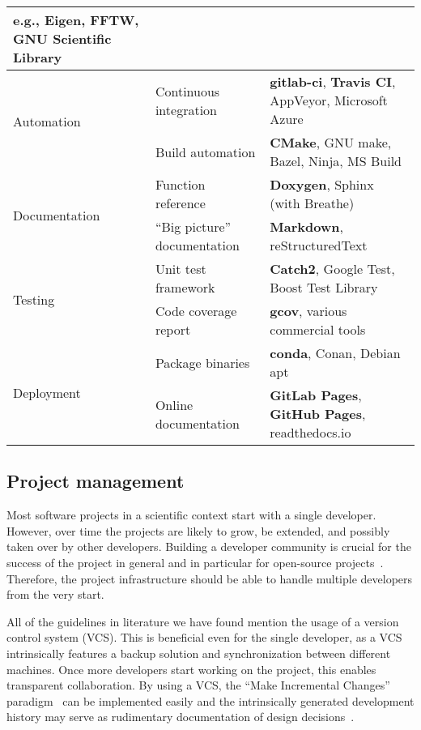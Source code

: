 \documentclass[@CLASSOPTIONS@]{tumarticle}
\begin{document}
\begin{table*}
\begin{tabular}{lll}
    e.g., Eigen, FFTW, GNU Scientific Library
    \\
    \hline
    \multirow{2}{*}{Automation}         & Continuous integration        &
    \textbf{gitlab-ci}, \textbf{Travis CI}, AppVeyor, Microsoft Azure
    \\
    \cline{2-3}
                                        & Build automation              &
    \textbf{CMake}, GNU make, Bazel, Ninja, MS Build
    \\
    \hline
    \multirow{2}{*}{Documentation}      & Function reference            &
    \textbf{Doxygen}, Sphinx (with Breathe)
    \\
    \cline{2-3}
                                        & ``Big picture'' documentation &
    \textbf{Markdown}, reStructuredText
    \\
    \hline
    \multirow{2}{*}{Testing}            & Unit test framework           &
    \textbf{Catch2}, Google Test, Boost Test Library
    \\
    \cline{2-3}
                                        & Code coverage report          &
    \textbf{gcov}, various commercial tools
    \\
    \hline
    \multirow{2}{*}{Deployment}         & Package binaries              &
    \textbf{conda}, Conan, Debian apt
    \\
    \cline{2-3}
                                        & Online documentation          &
    \textbf{GitLab Pages}, \textbf{GitHub Pages}, readthedocs.io
    \\
    \hline
  \end{tabular}
\end{table*}

\subsection{Project management}

Most software projects in a scientific context start with a single developer.
However, over time the projects are likely to grow, be extended, and possibly
taken over by other developers. Building a developer community is crucial for
the success of the project in general and in particular for open-source
projects~\cite{bangerth2013}. Therefore, the project infrastructure should be
able to handle multiple developers from the very start.

All of the guidelines in literature we have found mention the usage of a
version control system (VCS). This is beneficial even for the single
developer, as a VCS intrinsically features a backup solution and
synchronization between different machines. Once more developers start
working on the project, this enables transparent collaboration. By using a
VCS, the ``Make Incremental Changes'' paradigm~\cite{wilson2014, wilson2017}
can be implemented easily and the intrinsically generated development history
may serve as rudimentary documentation of design
decisions~\cite{bangerth2013}.
\end{document}
